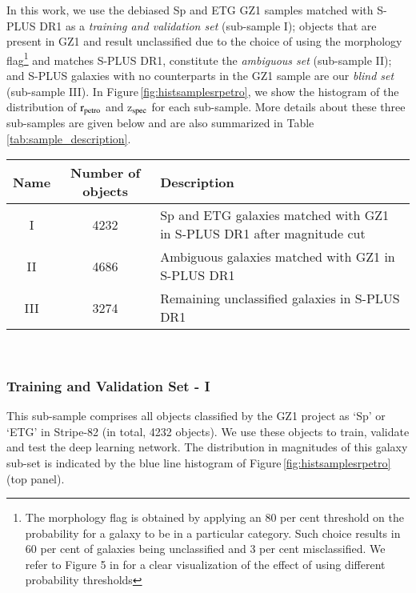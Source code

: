 \documentclass[fleqn,usenatbib]{mnras}
\begin{document}
In this work, we use the debiased Sp and ETG GZ1 samples matched with S-PLUS DR1 as a {\it training and validation set} (sub-sample I); objects that are present in GZ1 and result unclassified due to  the choice of using the morphology flag\footnote{The morphology flag is obtained by applying an 80 per cent threshold on the probability for a galaxy to be in a particular category. Such choice results in  60 per cent of galaxies being unclassified and 3 per cent misclassified. We refer to Figure 5 in  \citet{lintott2011} for a clear visualization of the effect of using different probability thresholds}   and matches S-PLUS DR1, constitute the {\it ambiguous set} (sub-sample II); and S-PLUS galaxies with no counterparts in the GZ1 sample are our {\it blind set} (sub-sample III). In Figure\,\ref{fig:histsamplesrpetro}, we show the histogram  of the distribution of ${\rm r}_{\rm petro}$ and z$_{\rm spec}$ for each sub-sample. More details about these three sub-samples are given below and are also summarized in Table\,\ref{tab:sample_description}.


\begin{table*}
\small
\caption{\label{tab:sample_description} Sample Description. In our sample the data are separated into three groups as indicated below. }
\begin{tabular}{ccl}
\hline\hline
Name & Number of objects & Description  \\

\hline 

I & 4232 & Sp and ETG galaxies matched with GZ1 in S-PLUS DR1 after magnitude cut \\
II & 4686  & Ambiguous galaxies matched with GZ1 in S-PLUS DR1    \\
III & 3274  & Remaining unclassified galaxies in S-PLUS DR1 \\

\hline \hline
\end{tabular}
\\
\end{table*}



\subsubsection{Training and Validation Set - I}


This sub-sample comprises all objects classified by the GZ1 project as `Sp' or `ETG' in Stripe-82 (in total, 4232 objects). We use these objects to train, validate and test the deep learning network. The distribution in magnitudes of this galaxy sub-set is indicated by the blue line histogram of Figure\,\ref{fig:histsamplesrpetro} (top panel).  
\end{document}
